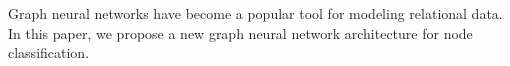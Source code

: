 Graph neural networks have become a popular tool for modeling relational data. In this paper, we propose a new graph neural network architecture for node classification.

